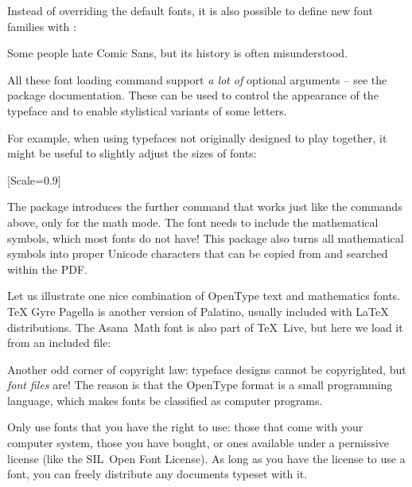 Instead of overriding the default fonts,
it is also possible to define new font families with :
%
\begin{ExampleCode}

Some people hate {\comicfont Comic Sans},
but its history is often {\comicfont misunderstood}.
\end{ExampleCode}
%
All these font loading command support \emph{a lot of} optional arguments
-- see the package documentation.
These can be used to control the appearance of the typeface
and to enable stylistical variants of some letters.

For example, when using typefaces not originally designed to play together,
it might be useful to slightly adjust the sizes of fonts:
%
\begin{ExampleCode}
[Scale=0.9]
\end{ExampleCode}

The  package introduces the further  command
that works just like the commands above, only for the math mode.
The font needs to include the mathematical symbols,
which most fonts do not have!
This package also turns all mathematical symbols into proper Unicode characters
that can be copied from and searched within the PDF.

Let us illustrate one nice combination of OpenType text and mathematics fonts.
\TeX{} Gyre Pagella is another version of Palatino, usually included with \LaTeX{} distributions.
The Asana~Math font is also part of \TeX~Live, but here we load it from an included file:
%
\begin{ExampleCode}
\usepackage{fontspec}
\setmainfont{TeX Gyre Pagella}
\usepackage{unicode-math}
\end{ExampleCode}
%


\begin{technote}
Another odd corner of copyright law:
typeface designs cannot be copyrighted, but \emph{font files} are!
The reason is that the OpenType format is a small programming language,
which makes fonts be classified as computer programs.

Only use fonts that you have the right to use:
those that come with your computer system,
those you have bought,
or ones available under a permissive license (like the SIL~Open Font License).
As long as you have the license to use a font,
you can freely distribute any documents typeset with it.
\end{technote}



